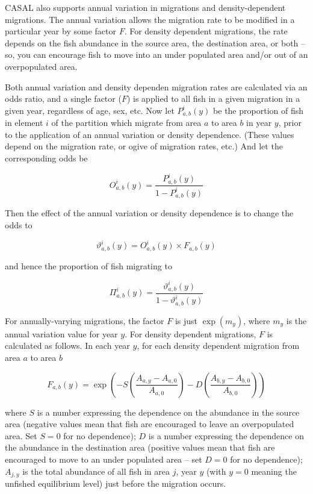 CASAL also supports annual variation in migrations and density-dependent migrations. The annual variation allows the migration rate to be modified in a particular year by some factor $F$. For density dependent migrations, the rate depends on the fish abundance in the source area, the destination area, or both \mbox{--} so, you can encourage fish to move into an under populated area and/or out of an overpopulated area.

Both annual variation and density dependen migration rates are calculated via an odds ratio, and a single factor ($F$) is applied to all fish in a given migration in a given year, regardless of age, sex, etc. Now let $P^i_{a,b}(y)$  be the proportion of fish in element $i$ of the partition which migrate from area $a$ to area $b$ in year $y$, prior to the application of an annual variation or density dependence. (These values depend on the migration rate, or ogive of migration rates, etc.) And let the corresponding odds be

\begin{equation}
O^i_{a,b} (y) = \frac{P^i_{a,b}(y)}{1 - P^i_{a,b}(y)}
\end{equation}

Then the effect of the annual variation or density dependence is to change the odds to

 \begin{equation}
 \vartheta^i_{a,b} (y) = O^i_{a,b}(y) \times F_{a,b}(y)
 \end{equation}

and hence the proportion of fish migrating to

\begin{equation}
\Pi^i_{a,b} (y) = \frac{\vartheta^i_{a,b}(y)}{1 - \vartheta^i_{a,b}(y)}
\end{equation}

For annually-varying migrations, the factor $F$ is just $\exp(m_y)$, where $m_y$ is the annual variation value for year $y$.  For density dependent migrations, $F$ is calculated as follows. In each year $y$, for each density dependent migration from area $a$ to area $b$

 \begin{equation}
 F_{a,b}(y) = \exp \left( -S \left( \frac{A_{a,y} - A_{a,0}}{A_{a,0}}\right) -D \left( \frac{A_{b,y} - A_{b,0}}{A_{b,0}} \right) \right)
 \end{equation}

where $S$ is a number expressing the dependence on the abundance in the source area (negative values mean that fish are encouraged to leave an overpopulated area. Set $S=0$ for no dependence); $D$ is a number expressing the dependence on the abundance in the destination area (positive values mean that fish are encouraged to move to an under populated area \mbox{--} set $D=0$ for no dependence); $A_{j,y}$ is the total abundance of all fish in area $j$, year $y$ (with $y=0$ meaning the unfished equilibrium level) just before the migration occurs.

